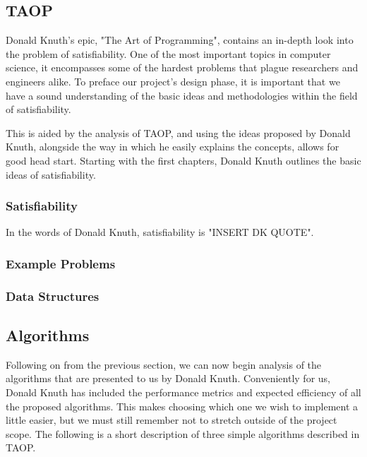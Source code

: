 \documentclass{article}
\begin{document}
\subsection{TAOP}
Donald Knuth's epic, "The Art of Programming", contains an in-depth look into the problem of satisfiability. One of the most important topics in computer
science, it encompasses some of the hardest problems that plague researchers and engineers alike. To preface our project's design phase, it is important
that we have a sound understanding of the basic ideas and methodologies within the field of satisfiability.

This is aided by the analysis of TAOP, and using the ideas proposed by Donald Knuth, alongside the way in which he easily explains the concepts, allows
for good head start. Starting with the first chapters, Donald Knuth outlines the basic ideas of satisfiability.

\subsubsection{Satisfiability}
In the words of Donald Knuth, satisfiability is "INSERT DK QUOTE".

\subsubsection{Example Problems}

\subsubsection{Data Structures}

\subsection{Algorithms}
Following on from the previous section, we can now begin analysis of the algorithms that are presented to us by Donald Knuth. Conveniently for us,
Donald Knuth has included the performance metrics and expected efficiency of all the proposed algorithms. This makes choosing which one we wish to implement
a little easier, but we must still remember not to stretch outside of the project scope. The following is a short description of three simple algorithms
described in TAOP. %
\end{document}
